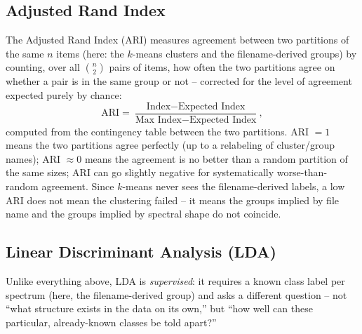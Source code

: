 \documentclass[11pt,a4paper]{article}
\begin{document}
\subsection{Adjusted Rand Index}
\label{sec:ari}
The Adjusted Rand Index (ARI) measures agreement between two partitions of
the same $n$ items (here: the $k$-means clusters and the filename-derived
groups) by counting, over all $\binom{n}{2}$ pairs of items, how often the
two partitions agree on whether a pair is in the same group or not --
corrected for the level of agreement expected purely by chance:
\[
  \text{ARI} = \frac{\text{Index} - \text{Expected Index}}
                     {\text{Max Index} - \text{Expected Index}} ,
\]
computed from the contingency table between the two partitions. ARI $=1$
means the two partitions agree perfectly (up to a relabeling of cluster/group
names); ARI $\approx 0$ means the agreement is no better than a random
partition of the same sizes; ARI can go slightly negative for systematically
worse-than-random agreement. Since $k$-means never sees the filename-derived
labels, a low ARI does not mean the clustering failed -- it means the
groups implied by file name and the groups implied by spectral shape do not
coincide.

\subsection{Linear Discriminant Analysis (LDA)}
\label{sec:lda}
Unlike everything above, LDA is \emph{supervised}: it requires a known class
label per spectrum (here, the filename-derived group) and asks a different
question -- not ``what structure exists in the data on its own,'' but
``how well can these particular, already-known classes be told apart?''
\end{document}
